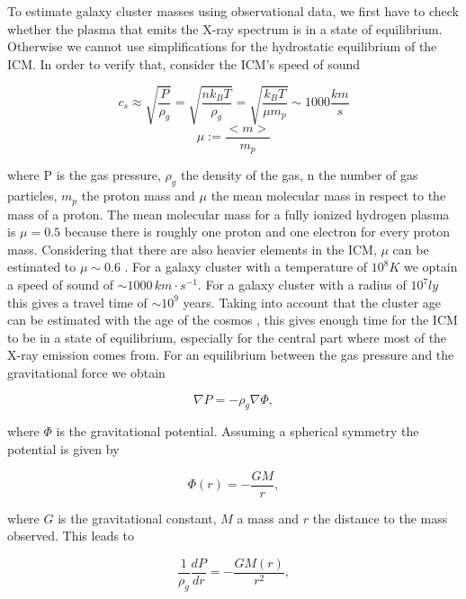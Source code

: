 To estimate galaxy cluster masses using observational data, we first have to check whether the plasma that emits the X-ray spectrum is in a state of equilibrium. Otherwise we cannot use simplifications for the hydrostatic equilibrium of the ICM. In order to verify that, consider the ICM's speed of sound

\begin{equation}
\label{c_s}
    c_s \approx \sqrt{\frac{P}{\rho_g}} = \sqrt{\frac{nk_B T}{\rho_g}} = \sqrt{\frac{k_B T}{\mu m_p}} \sim 1000 \frac{km}{s}
\end{equation}
\begin{equation}
    \mu := \frac{<m>}{m_p}
\end{equation}

where P is the gas pressure, $\rho_g$ the density of the gas, n the number of gas particles, $m_p$ the proton mass and $\mu$ the mean molecular mass in respect to the mass of a proton.
The mean molecular mass for a fully ionized hydrogen plasma is $\mu = 0.5$ because there is roughly one proton and one electron for every proton mass. Considering that there are also heavier elements in the ICM, $\mu$ can be estimated to $\mu \sim 0.6$ \citep{Ettori_2019}. For a galaxy cluster with a temperature of $10^8 K$ we optain a speed of sound of $\sim 1000 \, km \cdot s^{-1}$. For a galaxy cluster with a radius of $10^7ly$ this gives a travel time of $\sim 10^9$ years. Taking into account that the cluster age can be estimated with the age of the cosmos \citep{Rakos_2006}, this gives enough time for the ICM to be in a state of equilibrium, especially for the central part where most of the X-ray emission comes from.
For an equilibrium between the gas pressure and the gravitational force we obtain

\begin{equation}
    \nabla P = - \rho_g \nabla \Phi,
\end{equation}

where $\Phi$ is the gravitational potential. Assuming a spherical symmetry the potential is given by

\begin{equation}
    \Phi(r) = - \frac{GM}{r},
\end{equation}

where $G$ is the gravitational constant, $M$ a mass and $r$ the distance to the mass observed. This leads to

\begin{equation}
\label{dif_1}
    \frac{1}{\rho_g}\frac{dP}{dr} = - \frac{GM(r)}{r^2},
\end{equation}

